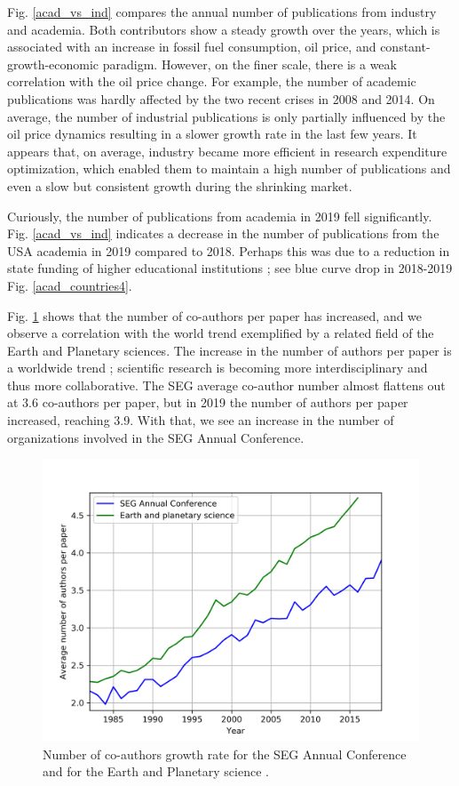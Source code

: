 \documentclass[energies,article,submit,moreauthors,pdftex]{Definitions/mdpi}
\begin{document}
Fig. \ref{acad_vs_ind} compares the annual number of publications from industry and academia. Both contributors show a steady growth over the years, which is associated with an increase in fossil fuel consumption, oil price, and constant-growth-economic paradigm. However, on the finer scale, there is a weak correlation with the oil price change. For example, the number of academic publications was hardly affected by the two recent crises in 2008 and 2014. On average, the number of industrial publications is only partially influenced by the oil price dynamics resulting in a slower growth rate in the last few years. It appears that, on average, industry became more efficient in research expenditure optimization, which enabled them to maintain a high number of publications and even a slow but consistent growth during the shrinking market.

Curiously, the number of publications from academia in 2019 fell significantly. Fig. \ref{acad_vs_ind} indicates a decrease in the number of publications from the USA academia in 2019 compared to 2018. Perhaps this was due to a reduction in state funding of higher educational institutions \citep{Brownstein2018}; see blue curve drop in 2018-2019 Fig. \ref{acad_countries4}.


Fig. \ref{co_auth} shows that the number of co-authors per paper has increased, and we observe a correlation with the world trend exemplified by a related field of the Earth and Planetary sciences. The increase in the number of authors per paper is a worldwide trend \citep{Mallapaty2018}; scientific research is becoming more interdisciplinary and thus more collaborative. The SEG average co-author number almost flattens out at 3.6 co-authors per paper, but in 2019 the number of authors per paper increased, reaching 3.9. With that, we see an increase in the number of organizations involved in the SEG Annual Conference.

\begin{figure}[ht!]
\centering
\includegraphics[scale=0.7]{Co_auth.png}
\caption{Number of co-authors growth rate for the SEG Annual Conference and for the Earth and Planetary science \citep{Mallapaty2018}.}
\label{co_auth}
\end{figure}
\end{document}
